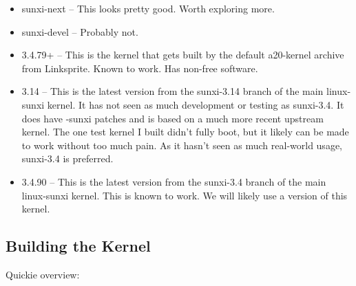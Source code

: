 \begin{itemize}
  \item sunxi-next -- This looks pretty good. Worth exploring more.

  \item sunxi-devel -- Probably not.

  \item 3.4.79+ -- This is the kernel that gets built by the default a20-kernel
  archive from Linksprite. Known to work. Has non-free software.

  \item 3.14 -- This is the latest version from the sunxi-3.14 branch of the main
  linux-sunxi kernel. It has not seen as much development or testing as
  sunxi-3.4. It does have -sunxi patches and is based on a much more recent
  upstream kernel. The one test kernel I built didn't fully boot, but it
  likely can be made to work without too much pain. As it hasn't seen as much
  real-world usage, sunxi-3.4 is preferred.

  \item 3.4.90 -- This is the latest version from the sunxi-3.4 branch of the main
  linux-sunxi kernel. This is known to work. We will likely use a version of
  this kernel.
\end{itemize}

\subsection{Building the Kernel}


Quickie overview:

